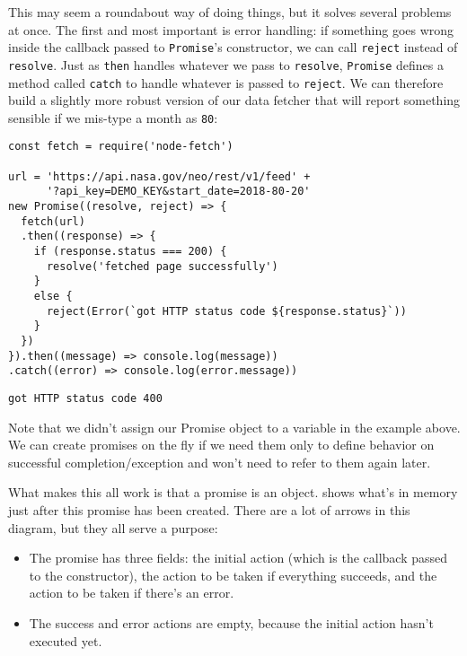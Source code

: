 This may seem a roundabout way of doing things,
but it solves several problems at once.
The first and most important is error handling:
if something goes wrong inside the callback passed to \texttt{Promise}'s constructor,
we can call \texttt{reject} instead of \texttt{resolve}.
Just as \texttt{then} handles whatever we pass to \texttt{resolve},
\texttt{Promise} defines a method called \texttt{catch} to handle whatever is passed to \texttt{reject}.
We can therefore build a slightly more robust version of our data fetcher
that will report something sensible if we mis-type a month as \texttt{80}:

\begin{verbatim}
const fetch = require('node-fetch')

url = 'https://api.nasa.gov/neo/rest/v1/feed' +
      '?api_key=DEMO_KEY&start_date=2018-80-20'
new Promise((resolve, reject) => {
  fetch(url)
  .then((response) => {
    if (response.status === 200) {
      resolve('fetched page successfully')
    }
    else {
      reject(Error(`got HTTP status code ${response.status}`))
    }
  })
}).then((message) => console.log(message))
.catch((error) => console.log(error.message))
\end{verbatim}

\begin{verbatim}
got HTTP status code 400
\end{verbatim}

\noindent
Note that we didn't assign our Promise object to a variable in the example above.
We can create promises on the fly if we need them only to define behavior on
successful completion/exception and won't need to refer to them again later.


What makes this all work is that a promise is an object.
 shows what's in memory just after this promise has been created.
There are a lot of arrows in this diagram,
but they all serve a purpose:

\begin{itemize}
\item
  The promise has three fields:
  the initial action (which is the callback passed to the constructor),
  the action to be taken if everything succeeds,
  and the action to be taken if there's an error.
\item
  The success and error actions are empty,
  because the initial action hasn't executed yet.
\end{itemize}

